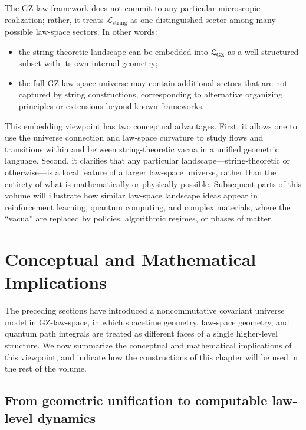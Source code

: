 \documentclass[11pt]{book}
\newcommand{\GZLS}{\ensuremath{\mathfrak{L}_{\mathrm{GZ}}}}
\theoremstyle{plain}
\theoremstyle{definition}
\theoremstyle{remark}
\begin{document}
The GZ-law framework does not commit to any particular microscopic
realization; rather, it treats $\mathcal{L}_{\mathrm{string}}$
as one distinguished sector among many possible law-space sectors.
In other words:

\begin{itemize}
  \item the string-theoretic landscape can be embedded into $\GZLS$
        as a well-structured subset with its own internal geometry;
  \item the full GZ-law-space universe may contain additional sectors
        that are not captured by string constructions, corresponding
        to alternative organizing principles or extensions beyond
        known frameworks.
\end{itemize}

This embedding viewpoint has two conceptual advantages. First, it
allows one to use the universe connection and law-space curvature
to study flows and transitions within and between string-theoretic
vacua in a unified geometric language. Second, it clarifies that
any particular landscape—string-theoretic or otherwise—is a local
feature of a larger law-space universe, rather than the entirety of
what is mathematically or physically possible. Subsequent parts of
this volume will illustrate how similar law-space landscape ideas
appear in reinforcement learning, quantum computing, and complex
materials, where the ``vacua'' are replaced by policies, algorithmic
regimes, or phases of matter.



\section{Conceptual and Mathematical Implications}
\label{sec:conceptual-mathematical-implications}


The preceding sections have introduced a noncommutative covariant
universe model in GZ-law-space, in which spacetime geometry, law-space
geometry, and quantum path integrals are treated as different faces
of a single higher-level structure. We now summarize the conceptual
and mathematical implications of this viewpoint, and indicate how the
constructions of this chapter will be used in the rest of the volume.

\subsection{From geometric unification to computable law-level dynamics}
\label{subsec:from-geom-to-computable}
\end{document}
